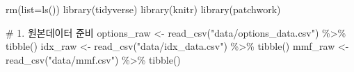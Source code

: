 \documentclass[
  a4paper,
  DIV=11,
  numbers=noendperiod]{scrreprt}
\newenvironment{Shaded}{\begin{snugshade}}{\end{snugshade}}
\newcommand{\AttributeTok}[1]{\textcolor[rgb]{0.40,0.45,0.13}{#1}}
\newcommand{\CommentTok}[1]{\textcolor[rgb]{0.37,0.37,0.37}{#1}}
\newcommand{\FunctionTok}[1]{\textcolor[rgb]{0.28,0.35,0.67}{#1}}
\newcommand{\NormalTok}[1]{\textcolor[rgb]{0.00,0.23,0.31}{#1}}
\newcommand{\OtherTok}[1]{\textcolor[rgb]{0.00,0.23,0.31}{#1}}
\newcommand{\SpecialCharTok}[1]{\textcolor[rgb]{0.37,0.37,0.37}{#1}}
\newcommand{\StringTok}[1]{\textcolor[rgb]{0.13,0.47,0.30}{#1}}
\begin{document}
\begin{Shaded}
\begin{Highlighting}[]
\FunctionTok{rm}\NormalTok{(}\AttributeTok{list=}\FunctionTok{ls}\NormalTok{())}
\FunctionTok{library}\NormalTok{(tidyverse)}
\FunctionTok{library}\NormalTok{(knitr)}
\FunctionTok{library}\NormalTok{(patchwork)}

\CommentTok{\# 1. 원본데이터 준비}
\NormalTok{options\_raw }\OtherTok{\textless{}{-}} \FunctionTok{read\_csv}\NormalTok{(}\StringTok{"data/options\_data.csv"}\NormalTok{) }\SpecialCharTok{\%\textgreater{}\%} \FunctionTok{tibble}\NormalTok{()}
\NormalTok{idx\_raw }\OtherTok{\textless{}{-}} \FunctionTok{read\_csv}\NormalTok{(}\StringTok{"data/idx\_data.csv"}\NormalTok{) }\SpecialCharTok{\%\textgreater{}\%} \FunctionTok{tibble}\NormalTok{()}
\NormalTok{mmf\_raw }\OtherTok{\textless{}{-}} \FunctionTok{read\_csv}\NormalTok{(}\StringTok{"data/mmf.csv"}\NormalTok{) }\SpecialCharTok{\%\textgreater{}\%} \FunctionTok{tibble}\NormalTok{()}


\end{Highlighting}
\end{Shaded}
\end{document}
